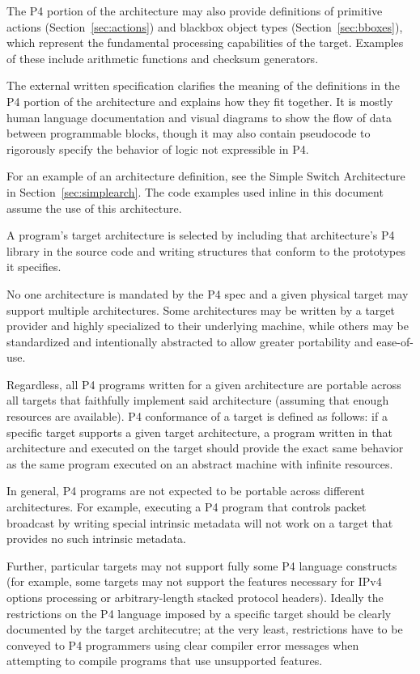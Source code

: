\documentclass[12pt]{article}
\begin{document}
The P4 portion of the architecture may also provide definitions of primitive
actions (Section~\ref{sec:actions}) and blackbox object types
(Section~\ref{sec:bboxes}), which represent the fundamental processing
capabilities of the target. Examples of these include arithmetic functions and
checksum generators.

The external written specification clarifies the meaning of the definitions
in the P4 portion of the architecture and explains how they fit together. It
is mostly human language documentation and visual diagrams to show the flow of
data between programmable blocks, though it may also contain pseudocode to
rigorously specify the behavior of logic not expressible in P4.

For an example of an architecture definition, see the Simple Switch Architecture
in Section~\ref{sec:simplearch}. The code examples used inline in this document
assume the use of this architecture.


A program's target architecture is selected by including that architecture's P4
library in the source code and writing structures that conform to the prototypes
it specifies.

No one architecture is mandated by the P4 spec and a given physical target may 
support multiple architectures. Some architectures may be written by a target
provider and highly specialized to their underlying machine, while others may
be standardized and intentionally abstracted to allow greater portability and
ease-of-use.

Regardless, all P4 programs written for a given architecture are portable across
all targets that faithfully implement said architecture (assuming that enough
resources are available). P4 conformance of a target is defined as follows: if a
specific target supports a given target architecture, a program written in that
architecture and executed on the target should provide the exact same behavior
as the same program executed  on an abstract machine with infinite resources.

In general, P4 programs are not expected to be portable across different
architectures. For example, executing a P4 program that controls packet
broadcast by writing special intrinsic metadata will not work on a target that
provides no such intrinsic metadata.

Further, particular targets may not support fully some P4 language constructs
(for example, some targets may not support the features necessary for IPv4
options processing or arbitrary-length stacked protocol headers). Ideally the
restrictions on the P4 language imposed by a specific target should be clearly
documented by the target architecutre; at the very least, restrictions have to
be conveyed to P4 programmers using clear compiler error messages when
attempting to compile programs that use unsupported features.
\end{document}
